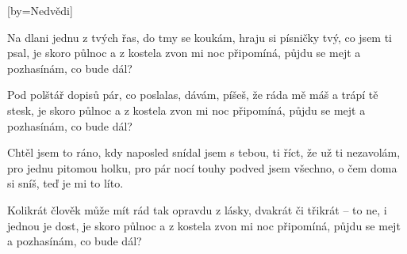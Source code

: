 [by={Nedvědi}]

\beginverse{}
Na dlani jednu z tvých řas, do tmy se koukám,
hraju si písničky tvý, co jsem ti psal,
je skoro půlnoc a z kostela zvon mi noc připomíná,
půjdu se mejt a pozhasínám, co bude dál?
\endverse{}

\beginverse{}
Pod polštář dopisů pár, co poslalas, dávám,
píšeš, že ráda mě máš a trápí tě stesk,
je skoro půlnoc a z kostela zvon mi noc připomíná,
půjdu se mejt a pozhasínám, co bude dál?
\endverse{}

\beginchorus{}
Chtěl jsem to ráno, kdy naposled snídal jsem s tebou,
ti říct, že už ti nezavolám,
pro jednu pitomou holku, pro pár nocí touhy
podved jsem všechno, o čem doma si sníš,
teď je mi to líto. 
\endchorus{}

\beginverse{}
Kolikrát člověk může mít rád tak opravdu z lásky,
dvakrát či třikrát -- to ne, i jednou je dost,
je skoro půlnoc a z kostela zvon mi noc připomíná,
půjdu se mejt a pozhasínám, co bude dál?
\endverse{}

\beginchorus{}
\phantom{}
\endchorus{}

\beginchorus{}
\phantom{}
\endchorus{}

\endsong{}
